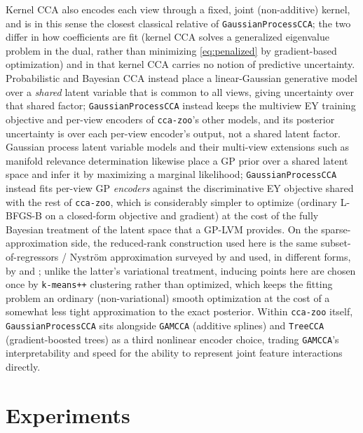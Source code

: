 \documentclass[11pt]{article}
\begin{document}
Kernel CCA \citep{hardoon2004canonical} also encodes each view through a fixed, joint (non-additive) kernel, and is in this sense the closest classical relative of \texttt{GaussianProcessCCA}; the two differ in how coefficients are fit (kernel CCA solves a generalized eigenvalue problem in the dual, rather than minimizing \eqref{eq:penalized} by gradient-based optimization) and in that kernel CCA carries no notion of predictive uncertainty. Probabilistic and Bayesian CCA \citep{bach2005probabilistic,klami2013bayesian} instead place a linear-Gaussian generative model over a \emph{shared} latent variable that is common to all views, giving uncertainty over that shared factor; \texttt{GaussianProcessCCA} instead keeps the multiview EY training objective and per-view encoders of \texttt{cca-zoo}'s other models, and its posterior uncertainty is over each per-view encoder's output, not a shared latent factor. Gaussian process latent variable models \citep{lawrence2005probabilistic} and their multi-view extensions such as manifold relevance determination \citep{damianou2012manifold} likewise place a GP prior over a shared latent space and infer it by maximizing a marginal likelihood; \texttt{GaussianProcessCCA} instead fits per-view GP \emph{encoders} against the discriminative EY objective shared with the rest of \texttt{cca-zoo}, which is considerably simpler to optimize (ordinary L-BFGS-B on a closed-form objective and gradient) at the cost of the fully Bayesian treatment of the latent space that a GP-LVM provides. On the sparse-approximation side, the reduced-rank construction used here is the same subset-of-regressors / Nystr\"om approximation surveyed by \citet{quinonero2005unifying} and used, in different forms, by \citet{snelson2006sparse} and \citet{titsias2009variational}; unlike the latter's variational treatment, inducing points here are chosen once by \texttt{k-means++} clustering rather than optimized, which keeps the fitting problem an ordinary (non-variational) smooth optimization at the cost of a somewhat less tight approximation to the exact posterior. Within \texttt{cca-zoo} itself, \texttt{GaussianProcessCCA} sits alongside \texttt{GAMCCA} (additive splines) and \texttt{TreeCCA} (gradient-boosted trees) as a third nonlinear encoder choice, trading \texttt{GAMCCA}'s interpretability and speed for the ability to represent joint feature interactions directly.

\section{Experiments}
\label{sec:experiments}
\end{document}
